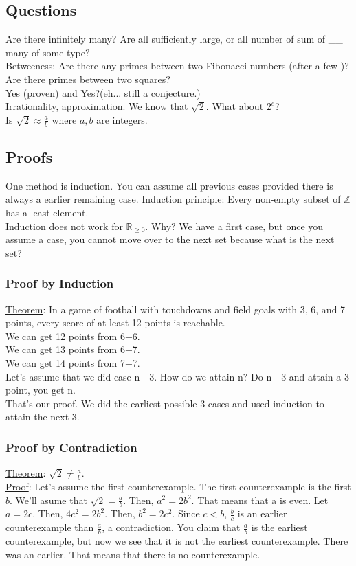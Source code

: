 \documentclass[13pt]{article}
\begin{document}
	\subsection*{Questions}
	Are there infinitely many? Are all sufficiently large, or all number of sum of \_\_ many of some type?\\
	Betweeness: Are there any primes between two Fibonacci numbers (after a few )? Are there primes between two squares?\\
	Yes (proven) and Yes?(eh... still a conjecture.)\\
	Irrationality, approximation. We know that $\sqrt{2}$. What about $2^e$?\\
	Is $\sqrt{2} \approx \frac{a}{b}$ where $a,b$ are integers.\\
	\subsection*{Proofs}
		One method is induction. You can assume all previous cases provided
		there is always a earlier remaining case. Induction principle: Every 
		non-empty subset of $\mathbb{Z}$ has a least element.\\
		Induction does not work for $\mathbb{R}_{\ge 0}$. Why? We have a first
		case, but once you assume a case, you cannot move over to the next set
		because what is the next set?\\
	\subsubsection*{Proof by Induction}
	\underline{Theorem}: In a game of football with touchdowns and field
	goals with 3, 6, and 7 points, every score of at least 12 points is
	reachable.\\
	We can get 12 points from 6+6.\\
	We can get 13 points from 6+7.\\
	We can get 14 points from 7+7.\\
	Let's assume that we did case n - 3. How do we attain n? Do n - 3 and
	attain a 3 point, you get n.\\
	That's our proof. We did the earliest possible 3 cases and used induction
	to attain the next 3.\\
	\subsubsection*{Proof by Contradiction}
		\underline{Theorem}: $\sqrt{2} \not= \frac{a}{b}$.\\
		\underline{Proof}: Let's assume the first counterexample. The first
		counterexample is the first $b$. We'll asume that $\sqrt{2} = 
		\frac{a}{b}$. Then, $a^2 = 2b^2$. That means that a is even. Let
		$a = 2c$. Then, $4c^2 = 2b^2$. Then, $b^2 = 2c^2$. Since $c < b$,
		$\frac{b}{c}$ is an earlier counterexample than $\frac{a}{b}$, a
		contradiction. You claim that $\frac{a}{b}$ is the earliest
		counterexample, but now we see that it is not the earliest 
		counterexample. There was an earlier. That means that there is no
		counterexample.
\end{document}
